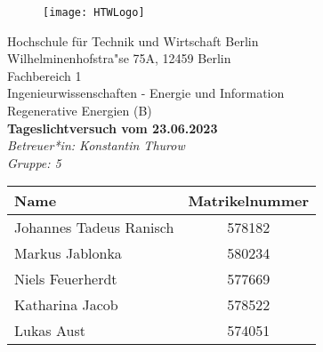 \begin{titlepage}

		\begin{figure}[h] 
				\begin{flushright}
			\texttt{[image: HTWLogo]}\\
				\end{flushright}
		\end{figure}
		
	\begin{center}
		\vspace*{\fill}
		{\Large Hochschule f{\"u}r Technik und Wirtschaft Berlin}\\
			\bigskip
			Wilhelminenhofstra"se 75A, 12459 Berlin\\
			\bigskip
		Fachbereich 1 \\Ingenieurwissenschaften - Energie und Information\\Regenerative Energien (B)\\
		\vfill
		 \textcolor{HTWGreen}{\textbf{\Large{Tageslichtversuch vom 23.06.2023}}}\\
		\textit{Betreuer*in: Konstantin Thurow}\\
		\textit{Gruppe: 5}\\
	\vfill
	\end{center}
\vfill
\begin{table}[H]
			\centering
			\begin{tabular}{|l|c|}
			\hline
			\rowcolor[cmyk]{0.55, 0.00, 1.00, 0.00} \textbf{Name} & \textbf{Matrikelnummer}  \\
			\hline
			Johannes Tadeus Ranisch     & 578182\\
			\hline
			Markus Jablonka       & 580234\\
			\hline
			Niels Feuerherdt      & 577669\\
			\hline
			Katharina Jacob			 & 578522\\
			\hline
			Lukas Aust			 & 574051\\
			\hline
			\end{tabular}
			\end{table}
\end{titlepage}
